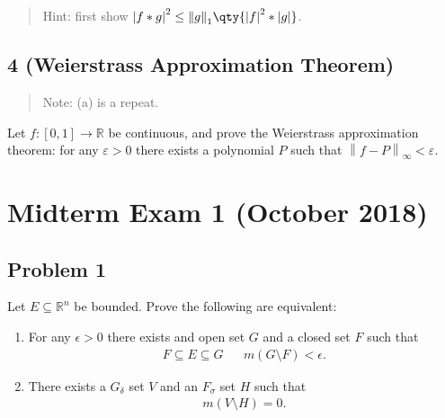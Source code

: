 \begin{quote}
Hint: first show
\({\left\lvert {f\ast g} \right\rvert}^2 \leq {\left\lVert {g} \right\rVert}_1 \qty{ {\left\lvert {f} \right\rvert}^2 \ast {\left\lvert {g} \right\rvert}}\).
\end{quote}

\hypertarget{weierstrass-approximation-theorem}{%
\subsection{4 (Weierstrass Approximation
Theorem)}\label{weierstrass-approximation-theorem}}

\begin{quote}
Note: (a) is a repeat.
\end{quote}

Let \(f: [0, 1]\to {\mathbb{R}}\) be continuous, and prove the
Weierstrass approximation theorem: for any \(\varepsilon> 0\) there
exists a polynomial \(P\) such that
\({\left\lVert {f - P} \right\rVert}_{\infty} < \varepsilon\).

\hypertarget{midterm-exam-1-october-2018}{%
\section{Midterm Exam 1 (October
2018)}\label{midterm-exam-1-october-2018}}

\hypertarget{problem-1}{%
\subsection{Problem 1}\label{problem-1}}

\label{equivalence_of_approximating_measures} Let
\(E \subseteq {\mathbb{R}}^n\) be bounded. Prove the following are
equivalent:

\begin{enumerate}
\def\labelenumi{\arabic{enumi}.}
\item
  For any \(\epsilon>0\) there exists and open set \(G\) and a closed
  set \(F\) such that
  \begin{align*}
  F \subseteq E \subseteq G && m(G\setminus F) < \epsilon
  .\end{align*}
\item
  There exists a \(G_ \delta\) set \(V\) and an \(F_ \sigma\) set \(H\)
  such that
  \begin{align*}
  m(V\setminus H) = 0
  .\end{align*}
\end{enumerate}

